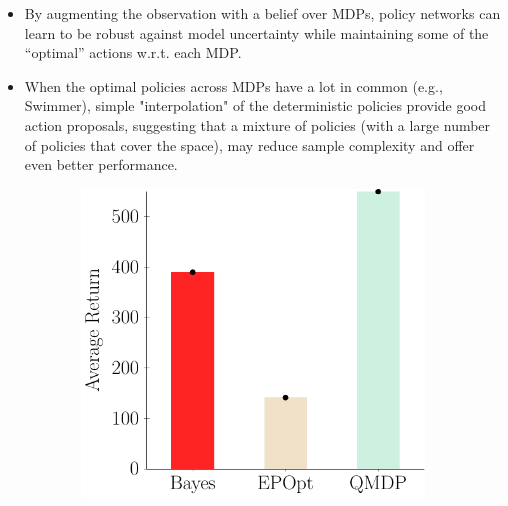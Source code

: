 \documentclass{article}
\begin{document}
\begin{itemize}
    \item By augmenting the observation with a belief over  MDPs, policy networks can learn to be robust against    model uncertainty while maintaining some of the
    ``optimal'' actions w.r.t. each MDP.
    \item When the optimal policies across MDPs have a lot in   common (e.g., Swimmer), simple "interpolation" of the deterministic policies provide good action proposals,
    suggesting that a mixture of policies (with a large number of policies that cover the space), may reduce sample complexity and offer even better performance.
\end{itemize}


\begin{figure}[t!]
\begin{centering}
\begin{subfigure}[b]{0.3\columnwidth}
\includegraphics[width=\linewidth]{figs/cheetah_nominal_comparison.pdf}
\end{subfigure}
~
\begin{subfigure}[b]{0.3\columnwidth}

\end{subfigure}
\end{centering}
\end{figure}
\end{document}
